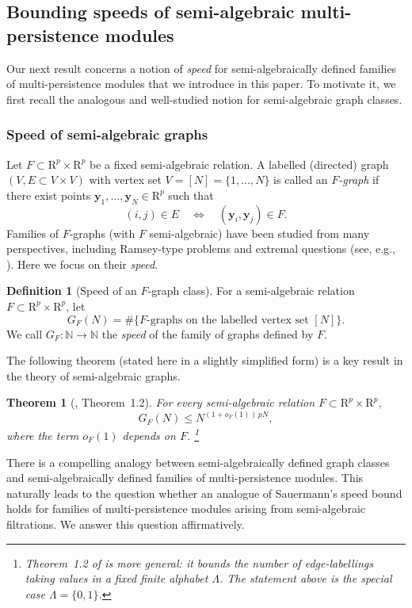 \documentclass{amsart}[10pts]
\newtheorem*{theorem*}{Theorem}
\theoremstyle{definition}
\newtheorem{definition}{Definition}[section]
\theoremstyle{remark}
\theoremstyle{observation}
\numberwithin{equation}{section}
\newcommand {\R} {\mathrm{R}}
\newcommand {\N}         {\mathbb{N}}
\newcommand{\y}{\mathbf{y}}
\begin{document}
\subsection{Bounding speeds of semi-algebraic multi-persistence modules}
\label{subsec:main:speed}
Our next result concerns a notion of \emph{speed} for semi-algebraically defined families of multi-persistence modules that we introduce in this paper. 
To motivate it, we first recall the analogous and well-studied notion for semi-algebraic graph classes.

\subsubsection{Speed of semi-algebraic graphs}
Let $F\subset \R^p\times \R^p$ be a fixed semi-algebraic relation. 
A labelled (directed) graph $(V,E\subset V\times V)$ with vertex set $V=[N]=\{1,\ldots,N\}$ is called an \emph{$F$-graph} if there exist points
$\y_1,\ldots,\y_N\in \R^p$ such that
\[
(i,j)\in E \quad\Longleftrightarrow\quad (\y_i,\y_j)\in F.
\]
Families of $F$-graphs (with $F$ semi-algebraic) have been studied from many perspectives, including Ramsey-type problems and extremal questions (see, e.g., \cite{Alon-Pach-et-al,Fox-et-al}). 
Here we focus on their \emph{speed}.

\begin{definition}[Speed of an $F$-graph class]
For a semi-algebraic relation $F\subset \R^p\times \R^p$, let
\[
G_F(N)=\#\{\text{$F$-graphs on the labelled vertex set $[N]$}\}.
\]
We call $G_F:\N\to \N$ the \emph{speed} of the family of graphs defined by $F$.
\end{definition}

The following theorem (stated here in a slightly simplified form) is a key result in the theory of semi-algebraic graphs.

\begin{theorem*}[\cite{Sauermann}, Theorem~1.2]
For every semi-algebraic relation $F\subset \R^p\times \R^p$,
\[
G_F(N)\le N^{(1+o_F(1))\,pN},
\]
where the term $o_F(1)$ depends on $F$.
\footnote{Theorem~1.2 of \cite{Sauermann} is more general: it bounds the number of edge-labellings taking values in a fixed finite alphabet $\Lambda$. The statement above is the special case $\Lambda=\{0,1\}$.}
\end{theorem*}

There is a compelling analogy between semi-algebraically defined graph classes and semi-algebraically defined families of multi-persistence modules. 
This naturally leads to the question whether an analogue of Sauermann's speed bound holds for families of multi-persistence modules arising from semi-algebraic filtrations. 
We answer this question affirmatively.
\end{document}
